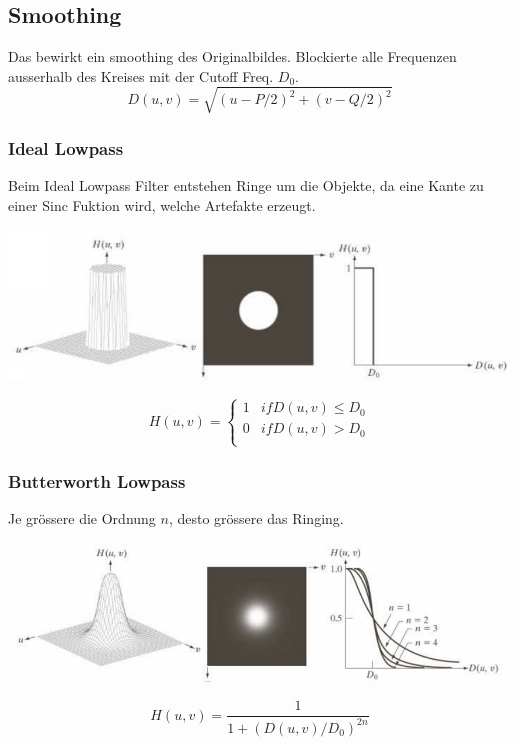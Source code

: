 \subsection{Smoothing}
Das bewirkt ein smoothing des Originalbildes. Blockierte alle Frequenzen ausserhalb des Kreises mit der Cutoff Freq. $D_0$.
\[
D(u,v) = \sqrt{(u-P/2)^2 + (v - Q/2)^2}
\]

\subsubsection{Ideal Lowpass}
Beim Ideal Lowpass Filter entstehen Ringe um die Objekte, da eine Kante zu einer Sinc Fuktion wird, welche Artefakte erzeugt. 
\begin{center}
	\includegraphics[width=\columnwidth]{Images/lp}
\end{center}

\[
H(u,v) = \begin{cases}
	1 & if D(u,v) \le D_0 \\
	0 & if D(u,v) \gt D_0 \\
\end{cases}
\]


\subsubsection{Butterworth Lowpass}
Je grössere die Ordnung $n$, desto grössere das Ringing.
\begin{center}
	\includegraphics[width=\columnwidth]{Images/butterworth}
\end{center}
\[
H(u,v) = \frac{1}{1 + \left(D(u,v)/D_0\right)^{2n}}
\]

